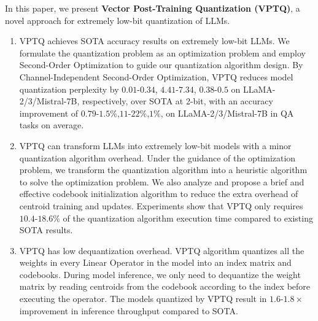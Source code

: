 In this paper, we present \textbf{Vector Post-Training Quantization (VPTQ)}, a novel approach for extremely low-bit quantization of LLMs. 
\begin{enumerate}[noitemsep]
    \item VPTQ achieves SOTA accuracy results on extremely low-bit LLMs. We formulate the quantization problem as an optimization problem and employ Second-Order Optimization to guide our quantization algorithm design. By Channel-Independent Second-Order Optimization, VPTQ reduces model quantization perplexity by $0.01$-$0.34$, $4.41$-$7.34$, $0.38$-$0.5$ on LLaMA-2/3/Mistral-7B, respectively, over SOTA at 2-bit, with an accuracy improvement of $0.79$-$1.5\%$,$11$-$22\%$,$1\%$, on LLaMA-2/3/Mistral-7B in QA tasks on average. 
    
    \item VPTQ can transform LLMs into extremely low-bit models with a minor quantization algorithm overhead. Under the guidance of the optimization problem, we transform the quantization algorithm into a heuristic algorithm to solve the optimization problem. 
    We also analyze and propose a brief and effective codebook initialization algorithm to reduce the extra overhead of centroid training and updates. Experiments show that VPTQ only requires $10.4$-$18.6\%$ of the quantization algorithm execution time compared to existing SOTA results.
    
    \item VPTQ has low dequantization overhead. VPTQ algorithm quantizes all the weights in every Linear Operator in the model into an index matrix and codebooks. During model inference, we only need to dequantize the weight matrix by reading centroids from the codebook according to the index before executing the operator. The models quantized by VPTQ result in $1.6$-$1.8\times$ improvement in inference throughput compared to SOTA.
\end{enumerate}

